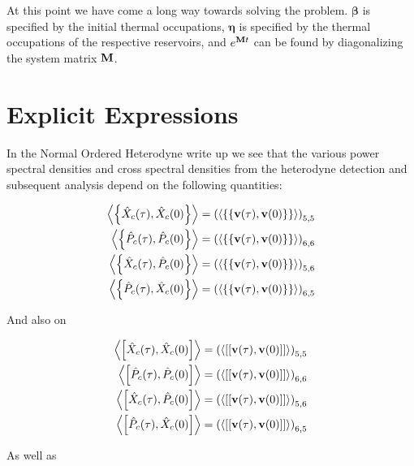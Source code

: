 \documentclass[12pt]{article}
\newcommand{\bv}[1]{\bold{#1}}
\begin{document}
At this point we have come a long way towards solving the problem. $\boldsymbol{\beta}$ is specified by the initial thermal occupations, $\boldsymbol{\eta}$ is specified by the thermal occupations of the respective reservoirs, and $e^{\bv{M}t}$ can be found by diagonalizing the system matrix $\bv{M}$.

\section{Explicit Expressions}

In the Normal Ordered Heterodyne write up we see that the various power spectral densities and cross spectral densities from the heterodyne detection and subsequent analysis depend on the following quantities:

\begin{align}
\Braket{\left\{\hat{X}_c(\tau),\hat{X}_c(0)\right\}} &= \left(\Braket{\left\{\left\{\bv{v}(\tau),\bv{v}(0)\right\}\right\}}\right)_{5,5}\\
\Braket{\left\{\hat{P}_c(\tau),\hat{P}_c(0)\right\}} &= \left(\Braket{\left\{\left\{\bv{v}(\tau),\bv{v}(0)\right\}\right\}}\right)_{6,6}\\
\Braket{\left\{\hat{X}_c(\tau),\hat{P}_c(0)\right\}} &= \left(\Braket{\left\{\left\{\bv{v}(\tau),\bv{v}(0)\right\}\right\}}\right)_{5,6}\\
\Braket{\left\{\hat{P}_c(\tau),\hat{X}_c(0)\right\}} &= \left(\Braket{\left\{\left\{\bv{v}(\tau),\bv{v}(0)\right\}\right\}}\right)_{6,5}\\
\end{align}

And also on

\begin{align}
\Braket{\left[\hat{X}_c(\tau),\hat{X}_c(0)\right]} &= \left(\Braket{\left[\left[\bv{v}(\tau),\bv{v}(0)\right]\right]}\right)_{5,5}\\
\Braket{\left[\hat{P}_c(\tau),\hat{P}_c(0)\right]} &= \left(\Braket{\left[\left[\bv{v}(\tau),\bv{v}(0)\right]\right]}\right)_{6,6}\\
\Braket{\left[\hat{X}_c(\tau),\hat{P}_c(0)\right]} &= \left(\Braket{\left[\left[\bv{v}(\tau),\bv{v}(0)\right]\right]}\right)_{5,6}\\
\Braket{\left[\hat{P}_c(\tau),\hat{X}_c(0)\right]} &= \left(\Braket{\left[\left[\bv{v}(\tau),\bv{v}(0)\right]\right]}\right)_{6,5}\\
\end{align}

As well as
\end{document}
